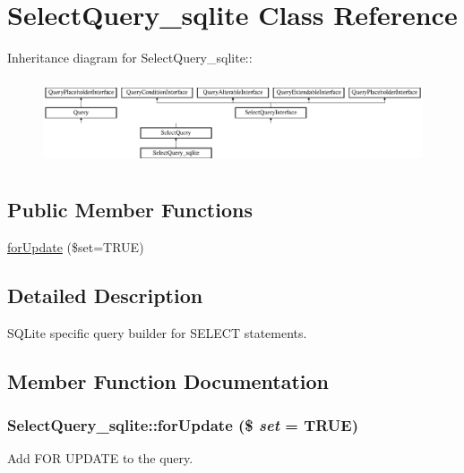 \hypertarget{classSelectQuery__sqlite}{
\section{SelectQuery\_\-sqlite Class Reference}
\label{classSelectQuery__sqlite}
}
Inheritance diagram for SelectQuery\_\-sqlite::\begin{figure}[H]
\begin{center}
\leavevmode
\includegraphics[height=2.57471cm]{classSelectQuery__sqlite}
\end{center}
\end{figure}
\subsection*{Public Member Functions}
\begin{DoxyCompactItemize}
\item 
\hyperlink{classSelectQuery__sqlite_ad217a519ab7b84ce58b3e0e48b9bb943}{forUpdate} (\$set=TRUE)
\end{DoxyCompactItemize}


\subsection{Detailed Description}
SQLite specific query builder for SELECT statements. 

\subsection{Member Function Documentation}
\hypertarget{classSelectQuery__sqlite_ad217a519ab7b84ce58b3e0e48b9bb943}{
\subsubsection[{forUpdate}]{\setlength{\rightskip}{0pt plus 5cm}SelectQuery\_\-sqlite::forUpdate (\$ {\em set} = {\ttfamily TRUE})}}
\label{classSelectQuery__sqlite_ad217a519ab7b84ce58b3e0e48b9bb943}
Add FOR UPDATE to the query.

